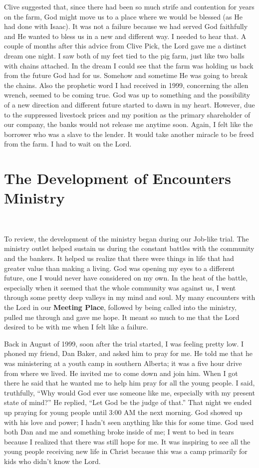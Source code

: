 \documentclass[twoside, 12pt]{book}
\begin{document}
Clive suggested that, since there had been so much strife and contention for years on the farm, God might move us to a place where we would be blessed (as He had done with Isaac). It was not a failure because we had served God faithfully and He wanted to bless us in a new and different way. I needed to hear that. A couple of months after this advice from Clive Pick, the Lord gave me a distinct dream one night. I saw both of my feet tied to the pig farm, just like two balls with chains attached. In the dream I could see that the farm was holding us back from the future God had for us. Somehow and sometime He was going to break the chains. Also the prophetic word I had received in 1999, concerning the allen wrench, seemed to be coming true. God was up to something and the possibility of a new direction and different future started to dawn in my heart. However, due to the suppressed livestock prices and my position as the primary shareholder of our company, the banks would not release me anytime soon. Again, I felt like the borrower who was a slave to the lender. It would take another miracle to be freed from the farm. I had to wait on the Lord.


\chapter{The Development of Encounters Ministry}
\

To review, the development of the ministry began during our Job-like trial. The ministry outlet helped sustain us during the constant battles with the community and the bankers. It helped us realize that there were things in life that had greater value than making a living. God was opening my eyes to a different future, one I would never have considered on my own. In the heat of the battle, especially when it seemed that the whole community was against us, I went through some pretty deep valleys in my mind and soul. My many encounters with the Lord in our \textbf{Meeting Place},  followed by being called into the ministry, pulled me through and gave me hope. It meant so much to me that the Lord desired to be with me when I felt like a failure. 

Back in August of 1999, soon after the trial started, I was feeling pretty low. I phoned my friend, Dan Baker, and asked him to pray for me. He told me that he was ministering at a youth camp in southern Alberta; it was a five hour drive from where we lived. He invited me to come down and join him. When I got there he said that he wanted me to help him pray for all the young people. I said, truthfully, “Why would God ever use someone like me, especially with my present state of mind?” He replied, “Let God be the judge of that.” That night we ended up praying for young people until 3:00 AM the next morning. God showed up with his love and power; I hadn’t seen anything like this for some time. God used both Dan and me and something broke inside of me; I went to bed in tears because I realized that there was still hope for me. It was inspiring to see all the young people receiving new life in Christ because this was a camp primarily for kids who didn’t know the Lord. 
\end{document}
